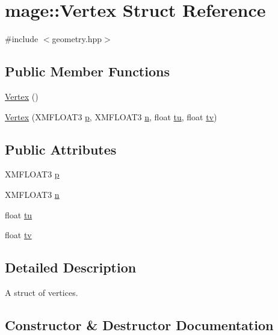 \hypertarget{structmage_1_1_vertex}{}\section{mage\+:\+:Vertex Struct Reference}
\label{structmage_1_1_vertex}


{\ttfamily \#include $<$geometry.\+hpp$>$}

\subsection*{Public Member Functions}
\begin{DoxyCompactItemize}
\item 
\hyperlink{structmage_1_1_vertex_a8bf3578fcb5595eab057dc2d1f916dce}{Vertex} ()
\item 
\hyperlink{structmage_1_1_vertex_a615029fe190db540ad0adb73b81ee8f5}{Vertex} (X\+M\+F\+L\+O\+A\+T3 \hyperlink{structmage_1_1_vertex_a9d726a508934b3baccfb01ea912420e7}{p}, X\+M\+F\+L\+O\+A\+T3 \hyperlink{structmage_1_1_vertex_a0b6c65dd92ba473f490e790189d92daf}{n}, float \hyperlink{structmage_1_1_vertex_a76d6a0ace40807f67c87e0dacd66da0d}{tu}, float \hyperlink{structmage_1_1_vertex_a08bf58ceae5197299c71204024b09ed2}{tv})
\end{DoxyCompactItemize}
\subsection*{Public Attributes}
\begin{DoxyCompactItemize}
\item 
X\+M\+F\+L\+O\+A\+T3 \hyperlink{structmage_1_1_vertex_a9d726a508934b3baccfb01ea912420e7}{p}
\item 
X\+M\+F\+L\+O\+A\+T3 \hyperlink{structmage_1_1_vertex_a0b6c65dd92ba473f490e790189d92daf}{n}
\item 
float \hyperlink{structmage_1_1_vertex_a76d6a0ace40807f67c87e0dacd66da0d}{tu}
\item 
float \hyperlink{structmage_1_1_vertex_a08bf58ceae5197299c71204024b09ed2}{tv}
\end{DoxyCompactItemize}


\subsection{Detailed Description}
A struct of vertices. 

\subsection{Constructor \& Destructor Documentation}
\hypertarget{structmage_1_1_vertex_a8bf3578fcb5595eab057dc2d1f916dce}{}\label{structmage_1_1_vertex_a8bf3578fcb5595eab057dc2d1f916dce} 
